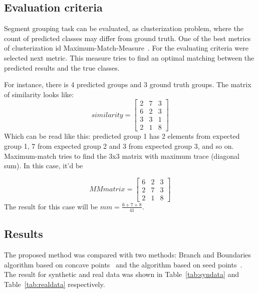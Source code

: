 \documentclass{lutmscthesis}[2010/09/22]
\begin{document}
\subsection{Evaluation criteria}
Segment grouping task can be evaluated, as clusterization problem, where the count of predicted classes may differ from ground truth. One of the best metrics of clusterization id Maximum-Match-Measure~\cite{mm-estimate}. For the evaluating criteria were selected next metric. This measure tries to find an optimal matching between the predicted results and the true classes.

For instance, there is 4 predicted groups and 3 ground truth groups. The matrix of similarity looks like:
\begin{equation}
similarity = 
        \begin{bmatrix}
            2& 7 & 3 \\
            6& 2 & 3\\
            3& 3& 1\\
            2& 1 & 8
        \end{bmatrix}
    \end{equation}
Which can be read like this: predicted group 1 has 2 elements from expected group 1, 7 from expected group 2 and 3 from expected group 3, and so on.
Maximum-match tries to find the 3x3 matrix with maximum trace (diagonal sum). In this case, it'd be

\begin{equation}
MMmatrix = 
        \begin{bmatrix}
            6& 2 & 3\\
            2& 7 & 3 \\
            2& 1 & 8
        \end{bmatrix}
    \end{equation}
The result for this case will be $mm = \frac{6+7+8}{41}$.

\subsection{Results}

The proposed method was compared with two methods: Branch and Boundaries algorithm based on concave points~\cite{zafari-bb} and the algorithm based on seed points~\cite{Zafari15}. The result for synthetic and  real data was shown in Table~\ref{tab:syndata} and Table~\ref{tab:realdata} respectively.
\end{document}
